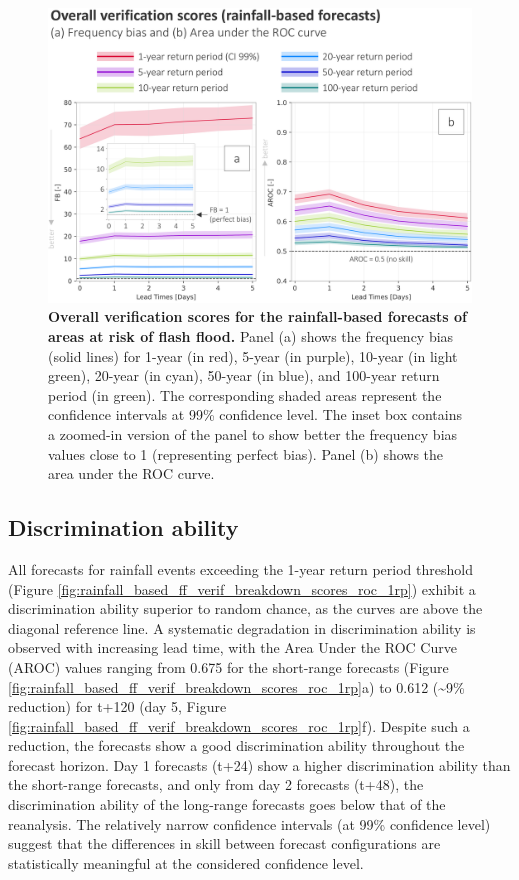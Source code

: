 \begin{figure}[htbp]
\centering
\includegraphics[width=\textwidth]{chapter_05/figures/rainfall_based_ff_verif_overall_scores.png}
\caption{\textbf{Overall verification scores for the rainfall-based forecasts of areas at risk of flash flood.} Panel (a) shows the frequency bias (solid lines) for 1-year (in red), 5-year (in purple), 10-year (in light green), 20-year (in cyan), 50-year (in blue), and 100-year return period (in green). The corresponding shaded areas represent the confidence intervals at 99\% confidence level. The inset box contains a zoomed-in version of the panel to show better the frequency bias values close to 1 (representing perfect bias). Panel (b) shows the area under the ROC curve.}
\label{fig:rainfall_based_ff_verif_overall_scores}
\end{figure}


\subsection{Discrimination ability}

All forecasts for rainfall events exceeding the 1-year return period threshold (Figure \ref{fig:rainfall_based_ff_verif_breakdown_scores_roc_1rp}) exhibit a discrimination ability superior to random chance, as the curves are above the diagonal reference line. A systematic degradation in discrimination ability is observed with increasing lead time, with the Area Under the ROC Curve (AROC) values ranging from 0.675 for the short-range forecasts (Figure \ref{fig:rainfall_based_ff_verif_breakdown_scores_roc_1rp}a) to 0.612 (\sim9\% reduction) for t+120 (day 5, Figure \ref{fig:rainfall_based_ff_verif_breakdown_scores_roc_1rp}f). Despite such a reduction, the forecasts show a good discrimination ability throughout the forecast horizon. Day 1 forecasts (t+24) show a higher discrimination ability than the short-range forecasts, and only from day 2 forecasts (t+48), the discrimination ability of the long-range forecasts goes below that of the reanalysis. The relatively narrow confidence intervals (at 99\% confidence level) suggest that the differences in skill between forecast configurations are statistically meaningful at the considered confidence level.

